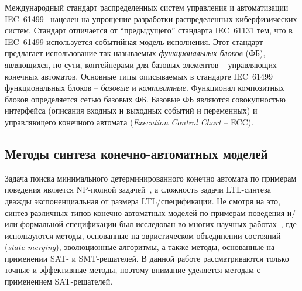 
Международный стандарт распределенных систем управления и автоматизации IEC~61499~\cite{vyatkin-tii} нацелен на упрощение разработки распределенных киберфизических систем.
Стандарт отличается от \enquote{предыдущего} стандарта IEC~61131\cite{iec-61131} тем, что в IEC~61499 используется событийная модель исполнения.
Этот стандарт предлагает использование так называемых \textit{функциональных блоков} (ФБ), являющихся, по-сути, контейнерами для базовых элементов \--- управляющих конечных автоматов.
Основные типы описываемых в стандарте IEC~61499 функциональных блоков \--- \textit{базовые} и \textit{композитные}.
Функционал композитных блоков определяется сетью базовых ФБ.
Базовые ФБ являются совокупностью интерфейса (описания входных и выходных событий и переменных) и управляющего конечного автомата (\textit{Execution Control Chart} \--- ECC).


\subsection{Методы синтеза конечно-автоматных моделей}
\label{sub:automata-synthesis}


Задача поиска минимального детерминированного конечно автомата по примерам поведения является NP-полной задачей~\cite{gold}, а сложность задачи LTL-синтеза дважды экспоненциальная от размера LTL\-/спецификации.
Не смотря на это, синтез различных типов конечно-автоматных моделей по примерам поведения и/или формальной спецификации был исследован во многих научных работах~\cite{heule2010,efsm-tools,zakirzyanov2019,buzhinsky-tii,bosy,tsarev-egorov-gecco,giantamidis-tripakis,petrenko,petrenko2,neider,g4ltl-st,smetsers-lata}, где используются методы, основанные на эвристическом объединении состояний (\textit{state merging}), эволюционные алгоритмы, а также методы, основанные на применении SAT- и SMT-решателей.
В данной работе рассматриваются только точные и эффективные методы, поэтому внимание уделяется методам с применением SAT-решателей.

